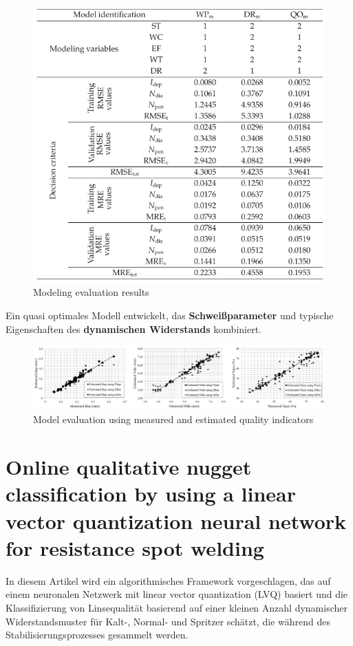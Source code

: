 \documentclass[english,ngerman]{tudscrreprt}
\begin{document}
\begin{figure}[H]
\centering
\includegraphics{./Bilder/Modeling evaluation results.png}
\caption{Modeling evaluation results}\label{fgg:evaluation results}
\end{figure}

Ein quasi optimales Modell entwickelt, das \textbf{Schweißparameter} und typische Eigenschaften des \textbf{dynamischen Widerstands} kombiniert.
\begin{figure}[H]
\centering
\includegraphics[scale = 0.7]{./Bilder/Model evaluation using measured and estimated quality indicators.png}
\caption{Model evaluation using measured and estimated quality indicators}\label{fgg:Model evaluation}
\end{figure}

\newpage
\section{Online qualitative nugget classification by using a linear vector quantization neural network for resistance spot welding\cite{ElBanna.2008}}
In diesem Artikel wird ein algorithmisches Framework vorgeschlagen, das auf einem neuronalen Netzwerk mit linear vector quantization (LVQ) basiert und die Klassifizierung von Linsequalität  basierend auf einer kleinen Anzahl dynamischer Widerstandsmuster für Kalt-, Normal- und Spritzer schätzt, die während des Stabilisierungsprozesses gesammelt werden.
\end{document}
